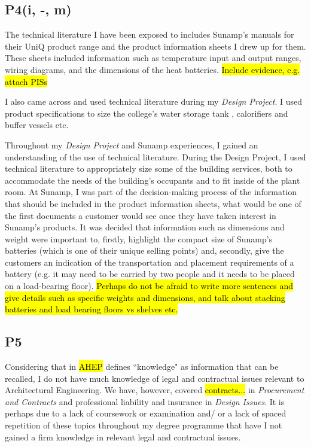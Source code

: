 \subsection*{P4(i, -, m)}

The technical literature I have been exposed to includes Sunamp's manuals for their UniQ product range and the product information sheets I drew up for them.
These sheets included information such as temperature input and output ranges, wiring diagrams, and the dimensions of the heat batteries.
\hl{Include evidence, e.g. attach PISs}

I also came across and used technical literature during my \textit{Design Project}.
I used product specifications to size the college's water storage tank \citep{Decca}, calorifiers and buffer vessels \citep{RycroftLtd} etc.

Throughout my \textit{Design Project} and Sunamp experiences, I gained an understanding of the use of technical literature.
During the Design Project, I used technical literature to appropriately size some of the building services, both to accommodate the needs of the building's occupants and to fit inside of the plant room.
At Sunamp, I was part of the decision-making process of the information that should be included in the product information sheets, what would be one of the first documents a customer would see once they have taken interest in Sunamp's products.
It was decided that information such as dimensions and weight were important to, firstly, highlight the compact size of Sunamp's batteries (which is one of their unique selling points) and, secondly, give the customers an indication of the transportation and placement requirements of a battery (e.g. it may need to be carried by two people and it needs to be placed on a load-bearing floor).
\hl{Perhaps do not be afraid to write more sentences and give details such as specific weights and dimensions, and talk about stacking batteries and load bearing floors vs shelves etc.}


\subsection*{P5}

Considering that in \hl{AHEP} defines ``knowledge" as information that can be recalled, I do not have much knowledge of legal and contractual issues relevant to Architectural Engineering.
We have, however, covered \hl{contracts...} in \textit{Procurement and Contracts} and professional liability and insurance in \textit{Design Issues}.
It is perhaps due to a lack of coursework or examination and/ or a lack of spaced repetition of these topics throughout my degree programme that have I not gained a firm knowledge in relevant legal and contractual issues.


